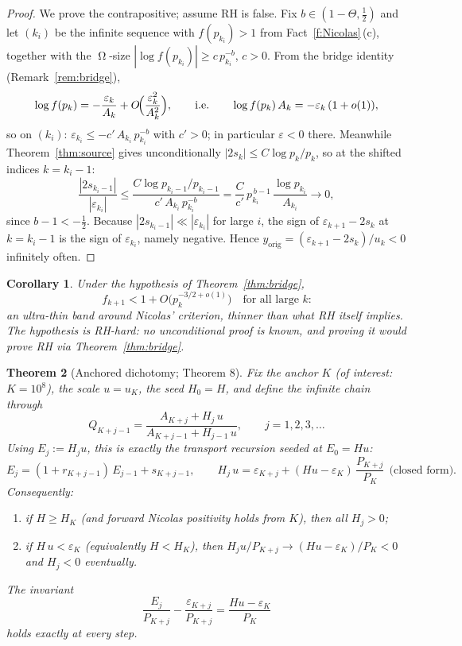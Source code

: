 \documentclass[11pt]{article}
\newtheorem{theorem}{Theorem}[section]
\newtheorem{corollary}[theorem]{Corollary}
\theoremstyle{remark}
\newcommand{\Ak}{A_k}
\newcommand{\uk}{u_k}
\newcommand{\eps}{\varepsilon}
\DeclareMathOperator{\Om}{\Omega}
\begin{document}
\begin{proof}
We prove the contrapositive; assume RH is false. Fix
$b\in(1-\Theta,\tfrac12)$ and let $(k_i)$ be the infinite sequence with
$f(p_{k_i})>1$ from Fact~\ref{f:Nicolas}\,(c), together with the $\Om$-size
$|\log f(p_{k_i})|\ge c\,p_{k_i}^{-b}$, $c>0$. From the bridge identity
(Remark~\ref{rem:bridge}),
\[
\log f(p_k)=-\frac{\eps_k}{\Ak}+O\!\Bigl(\frac{\eps_k^2}{\Ak^2}\Bigr),
\qquad\text{i.e.}\qquad
\log f(p_k)\,\Ak=-\eps_k\,(1+o(1)),
\]
so on $(k_i)$: $\eps_{k_i}\le-c'\,A_{k_i}\,p_{k_i}^{-b}$ with $c'>0$; in
particular $\eps<0$ there. Meanwhile Theorem~\ref{thm:source} gives
unconditionally $|2s_k|\le C\log p_k/p_k$, so at the shifted indices
$k=k_i-1$:
\[
\frac{|2s_{k_i-1}|}{|\eps_{k_i}|}
\le\frac{C\log p_{k_i-1}/p_{k_i-1}}{c'\,A_{k_i}\,p_{k_i}^{-b}}
=\frac{C}{c'}\,p_{k_i}^{\,b-1}\,\frac{\log p_{k_i}}{A_{k_i}}
\longrightarrow 0 ,
\]
since $b-1<-\tfrac12$. Because $|2s_{k_i-1}|\ll|\eps_{k_i}|$ for large $i$, the
sign of $\eps_{k+1}-2s_k$ at $k=k_i-1$ is the sign of $\eps_{k_i}$, namely negative.
Hence $y_{\mathrm{orig}}=(\eps_{k+1}-2s_k)/\uk<0$ infinitely often.
\end{proof}

\begin{corollary}\label{cor:thin}
Under the hypothesis of Theorem~\ref{thm:bridge},
\[
f_{k+1}<1+O\bigl(p_k^{-3/2+o(1)}\bigr)\quad\text{for all large $k$:}
\]
an \emph{ultra-thin} band around Nicolas' criterion, thinner than what RH
itself implies. The hypothesis is \emph{RH-hard}: no unconditional proof is
known, and proving it would prove RH via Theorem~\ref{thm:bridge}.
\end{corollary}

\begin{theorem}[Anchored dichotomy; Theorem 8]\label{thm:anchor}
Fix the anchor $K$ (of interest: $K=10^8$), the scale $u=u_K$, the seed
$H_0=H$, and define the infinite chain through
\[
Q_{K+j-1}=\frac{A_{K+j}+H_j\,u}{A_{K+j-1}+H_{j-1}\,u},
\qquad j=1,2,3,\dots
\]
Using $E_j:=H_j u$, this is exactly the transport recursion seeded at
$E_0=Hu$:
\[
E_j=(1+r_{K+j-1})\,E_{j-1}+s_{K+j-1},
\qquad
H_j\,u=\eps_{K+j}+(Hu-\eps_K)\,\frac{P_{K+j}}{P_K}\ \ \text{(closed form)} .
\]
Consequently:
\begin{enumerate}
\item if $H\ge H_K$ (and forward Nicolas positivity holds from $K$), then all
$H_j>0$;
\item if $H\,u<\eps_K$ (equivalently $H<H_K$), then $H_j u/P_{K+j}\to(Hu-\eps_K)/P_K<0$ and
$H_j<0$ \emph{eventually}.
\end{enumerate}
The invariant
\[
\frac{E_j}{P_{K+j}}-\frac{\eps_{K+j}}{P_{K+j}}
=\frac{Hu-\eps_K}{P_K}
\]
holds exactly at every step.
\end{theorem}
\end{document}
